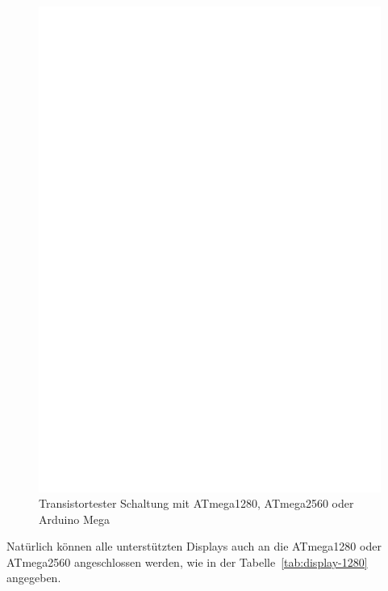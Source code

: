 \begin{figure}[H]
\centering
\includegraphics[width=18cm]{../FIG/t1280tester.eps}
\caption{Transistortester Schaltung mit ATmega1280, ATmega2560 oder Arduino Mega}
\label{fig:t1280tester}
\end{figure}

Natürlich können alle unterstützten Displays auch an die ATmega1280 oder ATmega2560 angeschlossen
werden, wie in der Tabelle~\ref{tab:display-1280} angegeben.

